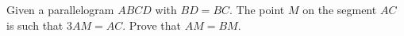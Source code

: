 \problem
Given a parallelogram $ ABCD $ with $ BD = BC $.
The point $M$ on the segment $AC$ is such that $3 AM = AC$.
Prove that $AM = BM$.

\solution

\endproblem
